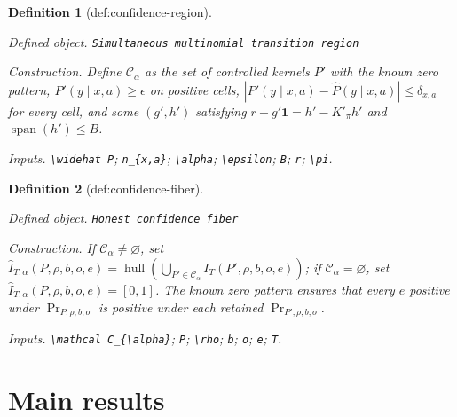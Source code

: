 \documentclass{article}
\newtheorem{definition}{Definition}
\begin{document}
\begin{definition}[def:confidence-region]\label{def:confidence-region}
\par\smallskip\noindent\emph{Defined object.} \texttt{Simultaneous multinomial transition region}
\par\smallskip\noindent\emph{Construction.} Define \(\mathcal C_{\alpha}\) as the set of controlled kernels \(P'\) with the known zero pattern, \(P'(y\mid x,a)\ge\epsilon\) on positive cells, \(|P'(y\mid x,a)-\widehat P(y\mid x,a)|\le\delta_{x,a}\) for every cell, and some \((g',h')\) satisfying \(r-g'\mathbf 1=h'-K'_{\pi}h'\) and \(\operatorname{span}(h')\le B\).
\par\smallskip\noindent\emph{Inputs.} \texttt{\textbackslash{}\allowbreak{}widehat P}; \texttt{n\_\allowbreak{}\{x,\allowbreak{}a\}\allowbreak{}}; \texttt{\textbackslash{}\allowbreak{}alpha}; \texttt{\textbackslash{}\allowbreak{}epsilon}; \texttt{B}; \texttt{r}; \texttt{\textbackslash{}\allowbreak{}pi}.
\end{definition}

\begin{definition}[def:confidence-fiber]\label{def:confidence-fiber}
\par\smallskip\noindent\emph{Defined object.} \texttt{Honest confidence fiber}
\par\smallskip\noindent\emph{Construction.} If \(\mathcal C_{\alpha}\neq\varnothing\), set \(\widehat I_{T,\alpha}(P,\rho,b,o,e)=\operatorname{hull}(\bigcup_{P'\in\mathcal C_{\alpha}}I_T(P',\rho,b,o,e))\); if \(\mathcal C_{\alpha}=\varnothing\), set \(\widehat I_{T,\alpha}(P,\rho,b,o,e)=[0,1]\). The known zero pattern ensures that every \(e\) positive under \(\Pr_{P,\rho,b,o}\) is positive under each retained \(\Pr_{P',\rho,b,o}\).
\par\smallskip\noindent\emph{Inputs.} \texttt{\textbackslash{}\allowbreak{}mathcal C\_\allowbreak{}\{\textbackslash{}\allowbreak{}alpha\}\allowbreak{}}; \texttt{P}; \texttt{\textbackslash{}\allowbreak{}rho}; \texttt{b}; \texttt{o}; \texttt{e}; \texttt{T}.
\end{definition}

\section{Main results}
\end{document}
